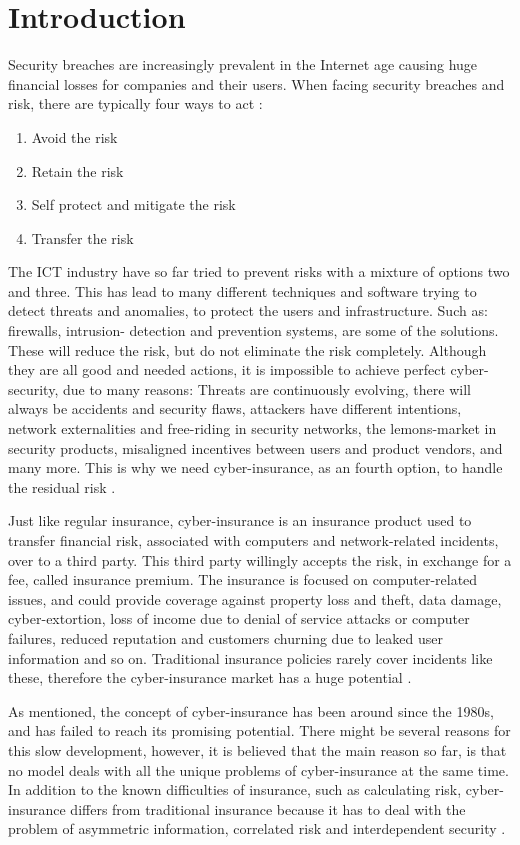 \section{Introduction}
Security breaches are increasingly prevalent in the Internet age causing huge financial losses
for companies and their users. When facing security breaches and risk, there are typically four ways to act \cite{bolot2008new}:
\begin{enumerate}
\item Avoid the risk
\item Retain the risk
\item Self protect and mitigate the risk
\item Transfer the risk
\end{enumerate}
The ICT industry have so far tried to prevent risks with a mixture of options two and three. This has lead to many different techniques and software trying to detect threats and anomalies, to protect the users and infrastructure. Such as: firewalls, intrusion- detection and prevention systems, are some of the solutions. These will reduce the risk, but do not eliminate the risk completely. Although they are all good and needed actions, it is impossible to achieve perfect cyber-security, due to many reasons: Threats are continuously evolving, there will always be accidents and security flaws, attackers have different intentions, network externalities and free-riding in security networks, the lemons-market in security products, misaligned incentives between users and product vendors, and many more. 
This is why we need cyber-insurance, as an fourth option, to handle the residual risk \cite{lelarge2009economic,paldifferentiating}.

Just like regular insurance, cyber-insurance is an insurance product used to transfer financial risk, associated with computers and network-related incidents, over to a third party. This third party willingly accepts the risk, in exchange for a fee, called insurance premium.
The insurance is focused on computer-related issues, and could provide coverage against property loss and theft, data damage, cyber-extortion, loss of income due to denial of service attacks or computer failures, reduced reputation and customers churning due to leaked user information and so on. Traditional insurance policies rarely cover incidents like these, therefore the cyber-insurance market has a huge potential \cite{washingtonpaper}.

As mentioned, the concept of cyber-insurance has been around since the 1980s, and has failed to reach its promising potential. There might be several reasons for this slow development, however, it is believed that the main reason so far, is that no model deals with all the unique problems of cyber-insurance at the same time. In addition to the known difficulties of insurance, such as calculating risk, cyber-insurance differs from traditional insurance because it has to deal with the problem of asymmetric information, correlated risk and interdependent security \cite{networkgames}.  

